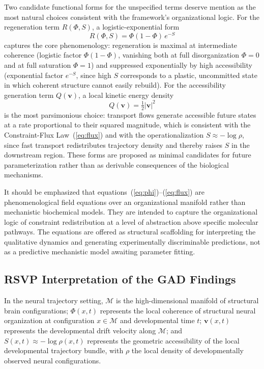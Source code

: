 \documentclass[11pt,a4paper]{article}
\theoremstyle{plain}
\theoremstyle{definition}
\begin{document}
Two candidate functional forms for the unspecified terms deserve mention as the most
natural choices consistent with the framework's organizational logic. For the
regeneration term $R(\Phi, S)$, a logistic-exponential form
\begin{equation}
R(\Phi, S) = \Phi(1 - \Phi)\,e^{-S}
\label{eq:R}
\end{equation}
captures the core phenomenology: regeneration is maximal at intermediate coherence
(logistic factor $\Phi(1-\Phi)$, vanishing both at full disorganization $\Phi = 0$
and at full saturation $\Phi = 1$) and suppressed exponentially by high accessibility
(exponential factor $e^{-S}$, since high $S$ corresponds to a plastic, uncommitted
state in which coherent structure cannot easily rebuild). For the accessibility
generation term $Q(\mathbf{v})$, a local kinetic energy density
\begin{equation}
Q(\mathbf{v}) = \tfrac{1}{2}|\mathbf{v}|^2
\label{eq:Q}
\end{equation}
is the most parsimonious choice: transport flows generate accessible future states
at a rate proportional to their squared magnitude, which is consistent with the
Constraint-Flux Law~(\ref{eq:flux}) and with the operationalization
$S \approx -\log\rho$, since fast transport redistributes trajectory density and
thereby raises $S$ in the downstream region. These forms are proposed as minimal
candidates for future parameterization rather than as derivable consequences of the
biological mechanisms.

It should be emphasized that equations~(\ref{eq:phi})--(\ref{eq:flux}) are
phenomenological field equations over an organizational manifold rather than mechanistic
biochemical models. They are intended to capture the organizational logic of constraint
redistribution at a level of abstraction above specific molecular pathways. The equations
are offered as structural scaffolding for interpreting the qualitative dynamics and
generating experimentally discriminable predictions, not as a predictive mechanistic
model awaiting parameter fitting.

\subsection{RSVP Interpretation of the GAD Findings}

In the neural trajectory setting, $\mathcal{M}$ is the high-dimensional manifold of
structural brain configurations; $\Phi(x, t)$ represents the local coherence of
structural neural organization at configuration $x \in \mathcal{M}$ and developmental
time $t$; $\mathbf{v}(x, t)$ represents the developmental drift velocity along
$\mathcal{M}$; and $S(x, t) \approx -\log\rho(x,t)$ represents the geometric
accessibility of the local developmental trajectory bundle, with $\rho$ the local
density of developmentally observed neural configurations.
\end{document}
